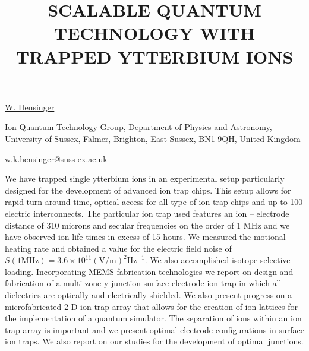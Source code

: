 \title{SCALABLE QUANTUM TECHNOLOGY WITH TRAPPED YTTERBIUM IONS}

\underline{W. Hensinger} 

{\normalsize{\vspace{-4mm}
Ion Quantum Technology Group, Department of Physics and Astronomy,
University of Sussex, Falmer, Brighton, East Sussex, BN1 9QH, United
Kingdom

\email w.k.hensinger@suss ex.ac.uk}}

We have trapped single ytterbium ions in an experimental setup particularly designed for the
development of advanced ion trap chips. This setup allows for rapid turn-around time, optical access
for all type of ion trap chips and up to 100 electric interconnects. The particular ion trap used
features an ion -- electrode distance of 310 microns and secular frequencies on the order of 1 MHz
and we have observed ion life times in excess of 15 hours. We measured the motional heating rate and
obtained a value for the electric field noise of $S(1\textrm{MHz}) = 3.6\times 10^{11}(\textrm{V/m})^2\textrm{Hz}^{-1}$. We also
accomplished isotope selective loading. Incorporating MEMS fabrication technologies we report on
design and fabrication of a multi-zone y-junction surface-electrode ion trap in which all
dielectrics are optically and electrically shielded. We also present progress on a microfabricated
2-D ion trap array that allows for the creation of ion lattices for the implementation of a quantum
simulator. The separation of ions within an ion trap array is important and we present optimal
electrode configurations in surface ion traps. We also report on our studies for the development of
optimal junctions.

\vspace{\baselineskip} 